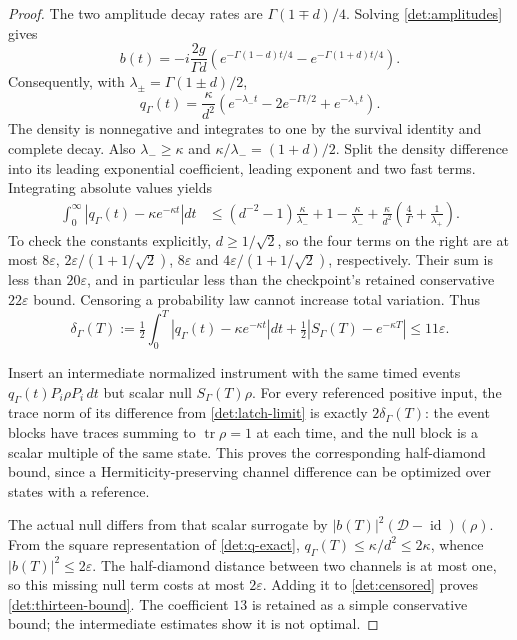 \documentclass[11pt,oneside,openany]{book}
\theoremstyle{definition}
\theoremstyle{remark}\newtheorem{remark}[theorem]{Remark}
\begin{document}
\begin{proof}
The two amplitude decay rates are $\Gamma(1\mp d)/4$. Solving
\eqref{det:amplitudes} gives
\[
 b(t)=-i\frac{2g}{\Gamma d}
       \left(e^{-\Gamma(1-d)t/4}-e^{-\Gamma(1+d)t/4}\right).
\]
Consequently, with $\lambda_\pm=\Gamma(1\pm d)/2$,
\begin{equation}
 q_\Gamma(t)=\frac{\kappa}{d^2}
    \left(e^{-\lambda_-t}-2e^{-\Gamma t/2}
                          +e^{-\lambda_+t}\right).           \label{det:q-exact}
\end{equation}
The density is nonnegative and integrates to one by the survival
identity and complete decay. Also $\lambda_-\ge\kappa$ and
$\kappa/\lambda_-=(1+d)/2$. Split the density difference into its
leading exponential coefficient, leading exponent and two fast terms.
Integrating absolute values yields
\begin{align}
 \int_0^\infty|q_\Gamma(t)-\kappa e^{-\kappa t}|dt
 &\le(d^{-2}-1)\frac{\kappa}{\lambda_-}
       +1-\frac{\kappa}{\lambda_-}
       +\frac{\kappa}{d^2}
                     \left(\frac4\Gamma+\frac1{\lambda_+}\right).
                                                        \label{det:q-l1}
\end{align}
To check the constants explicitly, $d\ge1/\sqrt2$, so the four
terms on the right are at most
$8\varepsilon$, $2\varepsilon/(1+1/\sqrt2)$,
$8\varepsilon$ and $4\varepsilon/(1+1/\sqrt2)$, respectively.
Their sum is less than $20\varepsilon$, and in particular less than
the checkpoint's retained conservative $22\varepsilon$ bound.
Censoring a probability law cannot increase total variation. Thus
\begin{equation}
 \delta_\Gamma(T):=\tfrac12\int_0^T
      |q_\Gamma(t)-\kappa e^{-\kappa t}|dt
       +\tfrac12|S_\Gamma(T)-e^{-\kappa T}|
                 \le11\varepsilon.                         \label{det:censored}
\end{equation}

Insert an intermediate normalized instrument with the same timed
events $q_\Gamma(t)P_i\rho P_i\,dt$ but scalar null
$S_\Gamma(T)\rho$. For every referenced positive input, the trace
norm of its difference from \eqref{det:latch-limit} is exactly
$2\delta_\Gamma(T)$: the event blocks have traces summing to
$\operatorname{tr}\rho=1$ at each time, and the null block is a
scalar multiple of the same state. This proves the corresponding
half-diamond bound, since a Hermiticity-preserving channel difference
can be optimized over states with a reference.

The actual null differs from that scalar surrogate by
$|b(T)|^2(\mathcal D-\operatorname{id})(\rho)$.
From the square representation of \eqref{det:q-exact},
$q_\Gamma(T)\le\kappa/d^2\le2\kappa$, whence
$|b(T)|^2\le2\varepsilon$.
The half-diamond distance between two channels is at most one,
so this missing null term costs at most $2\varepsilon$. Adding it to
\eqref{det:censored} proves \eqref{det:thirteen-bound}.
The coefficient $13$ is retained as a simple conservative bound;
the intermediate estimates show it is not optimal.


\end{proof}
\end{document}
